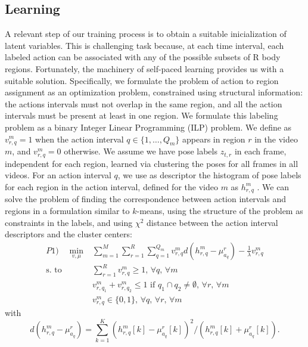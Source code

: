 \subsection{Learning} \label{subsec:learning}
A relevant step of our training process is to obtain a suitable inicialization 
of latent variables. This is challenging task because, at each time 
interval, each labeled action can be associated with any of the possible 
subsets of R body regions. Fortunately, the machinery of self-paced 
learning \cite{} provides us with a suitable solution. Specifically, we 
formulate the problem of action to region 
assignment as an optimization problem, constrained using structural 
information: 
the actions intervals must not overlap in the same region, and all the action 
intervals must be present at least in one region. We formulate this labeling 
problem as a binary Integer Linear Programming (ILP) problem. We define as 
$v_{r,q}^m=1$ when the action interval $q \in \{1,\dots,Q_m\}$ appears in 
region 
$r$ in the video $m$, and $v_{r,q}^m=0$ otherwise. We assume we have pose 
labels 
$z_{t,r}$ in each frame, independent for each region, learned via clustering 
the 
poses for all frames in all videos. For an action interval $q$, we use as 
descriptor the histogram of pose labels for each region in the action interval, 
defined for the video $m$ as $h_{r,q}^m$ . We can solve the problem of finding 
the correspondence between action intervals and regions in a formulation 
similar 
to $k$-means, using the structure of the problem as constraints in the labels, 
and using $\chi^2$ distance between the action interval descriptors and the 
cluster centers: 
\begin{equation}
\begin{split}
P1) \quad \min_{v,\mu} &\sum_{m=1}^M  \sum_{r=1}^R \sum_{q=1}^{Q_m}  v_{r,q}^m 
d( h_{r,q}^m - \mu_{a_q}^r) -\frac{1}{\lambda} v_{r,q}^m\\ 
 \text{s. to} 
\quad 
& \sum_{r=1}^R v_{r,q}^m \ge 1\text{, }\forall q\text{, }\forall m \\ 
& v_{r,q_1}^m + v_{r,q_2}^m \le 1 \text{ if } q_1\cap q_2 \neq \emptyset 
\text{, 
}\forall r\text{, }\forall m\\  
& v_{r,q}^m \in \{0,1\}\text{, }\forall q\text{, }\forall{r}\text{, }\forall m
\end{split}
\end{equation}
with
\begin{equation}
d( h_{r,q}^m - \mu_{a_q}^r) = \sum_{k=1}^K (h_{r,q}^m[k] - 
\mu_{a_q}^r[k])^2/(h_{r,q}^m[k] +\mu_{a_q}^r[k]).
\end{equation}

